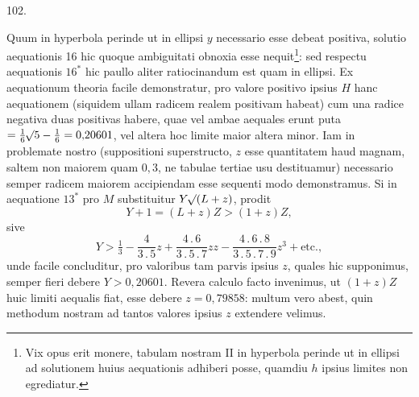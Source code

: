 \par{}\medskip
{}
\begin{center}102.\end{center}
Quum in hyperbola perinde ut in ellipsi $y$ necessario esse debeat positiva, solutio aequationis 16 hic quoque ambiguitati obnoxia esse nequit\footnote{Vix opus erit monere, tabulam nostram II in hyperbola perinde ut in ellipsi ad solutionem huius aequationis adhiberi posse, quamdiu $h$ ipsius limites non egrediatur.}: sed respectu aequationis $16^*$ hic paullo aliter ratiocinandum est quam in ellipsi. Ex aequationum theoria facile demonstratur, pro valore positivo ipsius $H$ hanc aequationem (siquidem ullam radicem realem positivam habeat) cum una radice negativa duas positivas habere, quae vel ambae aequales erunt puta $=\tfrac16\mathord{{}^{}\!\surd}5-\tfrac16=0{,}20601$, vel altera hoc limite maior altera minor. Iam in problemate nostro (suppositioni superstructo, $z$ esse quantitatem haud magnam, saltem non maiorem quam $0{,}3$, ne tabulae tertiae usu destituamur) necessario semper radicem maiorem accipiendam esse sequenti modo demonstramus. Si in aequatione $13^*$ pro $M$ substituitur $Y\mathord{{}^{}\!\surd}(L+z)$, prodit
\[
Y+1=(L+z)Z>(1+z)Z,
\]
\noindent sive
\[
Y>\tfrac13-\frac4{3\mathpunct{.}5}z+\frac{4\mathpunct{.}6}{3\mathpunct{.}5\mathpunct{.}7}zz-\frac{4\mathpunct{.}6\mathpunct{.}8}{3\mathpunct{.}5\mathpunct{.}7\mathpunct{.}9}z^3+\text{etc.},
\]
\noindent unde facile concluditur, pro valoribus tam parvis ipsius $z$, quales hic supponimus, semper fieri debere $Y>0{,}20601$. Revera calculo facto invenimus, ut $(1+z)Z$ huic limiti aequalis fiat, esse debere $z=0{,}79858$: multum vero abest, quin methodum nostram ad tantos valores ipsius $z$ extendere velimus.
